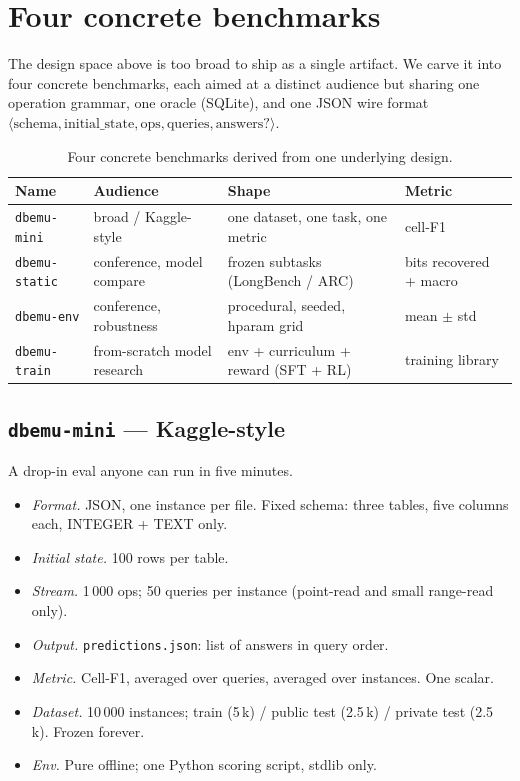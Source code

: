 \documentclass[11pt]{article}
\begin{document}
\section{Four concrete benchmarks}
\label{sec:four}

The design space above is too broad to ship as a single artifact. We
carve it into four concrete benchmarks, each aimed at a distinct
audience but sharing one operation grammar, one oracle (SQLite), and
one JSON wire format $\langle \text{schema}, \text{initial\_state},
\text{ops}, \text{queries}, \text{answers}? \rangle$.

\begin{table}[h]
\centering
\small
\begin{tabularx}{\linewidth}{@{}l Y Y Y@{}}
\toprule
Name & Audience & Shape & Metric \\
\midrule
\texttt{dbemu-mini}   & broad / Kaggle-style        & one dataset, one task, one metric    & cell-F1 \\
\texttt{dbemu-static} & conference, model compare   & frozen subtasks (LongBench / ARC)    & bits recovered + macro \\
\texttt{dbemu-env}    & conference, robustness      & procedural, seeded, hparam grid      & mean $\pm$ std \\
\texttt{dbemu-train}  & from-scratch model research & env + curriculum + reward (SFT + RL) & training library \\
\bottomrule
\end{tabularx}
\caption{Four concrete benchmarks derived from one underlying design.}
\label{tab:four}
\end{table}

\subsection{\texttt{dbemu-mini} --- Kaggle-style}

A drop-in eval anyone can run in five minutes.

\begin{itemize}[leftmargin=*]
  \item \emph{Format.} JSON, one instance per file. Fixed schema:
    three tables, five columns each, INTEGER + TEXT only.
  \item \emph{Initial state.} 100 rows per table.
  \item \emph{Stream.} 1\,000 ops; 50 queries per instance (point-read
    and small range-read only).
  \item \emph{Output.} \texttt{predictions.json}: list of answers in
    query order.
  \item \emph{Metric.} Cell-F1, averaged over queries, averaged over
    instances. One scalar.
  \item \emph{Dataset.} 10\,000 instances; train (5\,k) / public test
    (2.5\,k) / private test (2.5\,k). Frozen forever.
  \item \emph{Env.} Pure offline; one Python scoring script, stdlib
    only.
\end{itemize}
\end{document}

